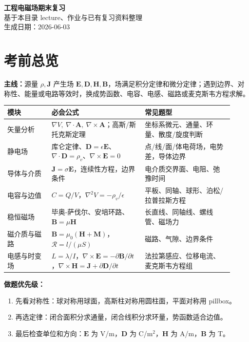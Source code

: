 \documentclass[11pt,a4paper]{ctexart}
\newcommand{\E}{\bm E}
\newcommand{\D}{\bm D}
\newcommand{\B}{\bm B}
\newcommand{\Hf}{\bm H}
\newcommand{\J}{\bm J}
\newcommand{\M}{\bm M}
\newcommand{\A}{\bm A}
\newcommand{\curl}{\nabla\times}
\newcommand{\divg}{\nabla\cdot}
\newcommand{\grad}{\nabla}
\begin{document}
\begin{center}
{\huge\bfseries 工程电磁场期末复习}\\[4pt]
{\large 基于本目录 lecture、作业与已有复习资料整理}\\[2pt]
{\small 生成日期：2026-06-03}
\end{center}

\tableofcontents
\newpage

\section{考前总览}
\textbf{主线：}源量 $\rho,\J$ 产生场 $\E,\D,\Hf,\B$，场满足积分定律和微分定律；遇到边界、对称性、能量或电路等效时，换成势函数、电容、电感、磁路或麦克斯韦方程求解。

\begin{longtable}{p{0.18\linewidth}p{0.38\linewidth}p{0.36\linewidth}}
\toprule
模块 & 必会公式 & 常见题型 \\
\midrule
矢量分析 & $\grad V,\ \divg \A,\ \curl \A$；高斯/斯托克斯定理 & 坐标系微元、通量、环量、散度/旋度判断 \\
静电场 & 库仑定律、$\D=\epsilon\E$、$\divg\D=\rho_v$、$\curl\E=0$ & 点/线/面/体电荷场，电势差，导体边界 \\
导体与介质 & $\J=\sigma\E$，连续性方程，边界条件 & 电介质交界面、电阻、弛豫时间 \\
电容与边值 & $C=Q/V$，$\nabla^2 V=-\rho_v/\epsilon$ & 平板、同轴、球形、泊松/拉普拉斯方程 \\
稳恒磁场 & 毕奥-萨伐尔、安培环路、$\B=\mu\Hf$ & 长直线、同轴线、螺线管、磁场力 \\
磁介质与磁路 & $\B=\mu_0(\Hf+\M)$，$\mathcal R=l/(\mu S)$ & 磁路、气隙、边界条件 \\
电感与时变场 & $L=\lambda/I$，$\curl\E=-\partial \B/\partial t$，$\curl\Hf=\J+\partial\D/\partial t$ & 法拉第感应、位移电流、麦克斯韦方程组 \\
\bottomrule
\end{longtable}

\textbf{做题优先级：}
\begin{enumerate}
\item 先看对称性：球对称用球面，高斯柱对称用圆柱面，平面对称用 pillbox。
\item 再选定律：闭合面积分求通量，闭合线积分求环量，势函数适合边值。
\item 最后检查单位和方向：$\E$ 为 V/m，$\D$ 为 C/m$^2$，$\Hf$ 为 A/m，$\B$ 为 T。
\end{enumerate}
\end{document}
